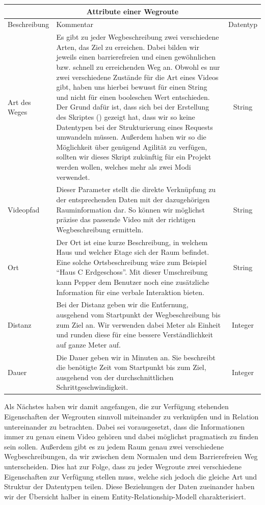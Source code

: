 \begin{tabular}{| l | p{9.45cm} | c| } \hline 
\multicolumn{3}{|c|}{\textbf{Attribute einer Wegroute}}\\ \hline\hline
Beschreibung & Kommentar & Datentyp \\
\hline
Art des Weges & \small Es gibt zu jeder Wegbeschreibung zwei verschiedene Arten, das Ziel 
zu erreichen. Dabei bilden wir jeweils einen barrierefreien und einen gewöhnlichen 
bzw. schnell zu erreichenden Weg an. Obwohl es nur zwei verschiedene Zustände für die Art eines Videos gibt, haben uns hierbei bewusst für einen String und nicht für einen booleschen Wert entschieden. Der Grund dafür ist, dass sich bei der Erstellung des Skriptes () gezeigt hat, dass wir so keine Datentypen bei der Strukturierung eines Requests umwandeln müssen. Außerdem haben wir so die Möglichkeit über genügend Agilität zu verfügen, sollten wir dieses Skript zukünftig für ein Projekt werden wollen, welches mehr als zwei Modi verwendet. & String\\[0.5ex]
\hline
Videopfad &  \small Dieser Parameter stellt die direkte Verknüpfung zu der entsprechenden Daten mit der dazugehörigen Rauminformation dar. So können wir möglichst präzise das passende Video mit der richtigen Wegbeschreibung ermitteln.
& String\\
\hline
Ort &   \small Der Ort ist eine kurze Beschreibung, in welchem Haus und welcher Etage sich der Raum befindet. Eine solche Ortsbeschreibung wäre zum Beispiel “Haus C Erdgeschoss”. Mit dieser Umschreibung kann Pepper dem Benutzer noch eine zusätzliche Information für eine verbale Interaktion bieten. & String\\
\hline
Distanz & \small Bei der Distanz geben wir die Entfernung, ausgehend vom Startpunkt der Wegbeschreibung bis zum Ziel an. Wir verwenden dabei Meter als Einheit und runden diese für eine bessere Verständlichkeit auf ganze Meter auf. & Integer\\
\hline
Dauer & \small Die Dauer geben wir in Minuten an. Sie beschreibt die benötigte Zeit vom Startpunkt bis zum Ziel, ausgehend von der durchschnittlichen Schrittgeschwindigkeit. & Integer\\
\hline
\end{tabular} \vspace{5mm}

Als Nächstes haben wir damit angefangen, die zur Verfügung stehenden Eigenschaften der Wegrouten sinnvoll miteinander zu verknüpfen und in Relation untereinander zu betrachten. Dabei sei vorausgesetzt, dass die Informationen immer zu genau einem Video gehören und dabei möglichst pragmatisch zu finden sein sollen. Außerdem gibt es zu jedem Raum genau zwei verschiedene Wegbeschreibungen, da wir zwischen dem Normalen und dem Barrierefreien Weg unterscheiden. Dies hat zur Folge, dass zu jeder Wegroute zwei verschiedene Eigenschaften zur Verfügung stellen muss, welche sich jedoch die gleiche Art und Struktur der Datentypen teilen. Diese Beziehungen der Daten zueinander haben wir der Übersicht halber in einem Entity-Relationship-Modell  charakterisiert.

